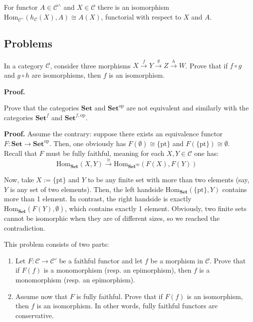 \documentclass{category-template}
\begin{document}
\begin{lemma}
    For functor $A \in \mathcal{C}^{\wedge}$ and $X \in \mathcal{C}$ there is an
    isomorphism $\text{Hom}_{\mathcal{C}^{\wedge}}(h_{\mathcal{C}}(X), A) \cong
    A(X)$, functorial with respect to $X$ and $A$.
\end{lemma}

\subsection{Problems}

\begin{problem}
    In a category $\mathcal{C}$, consider three morphisms $X \xrightarrow{f} Y
    \xrightarrow{g} Z \xrightarrow{h} W$. Prove that if $f \circ g$ and $g \circ
    h$ are isomorphisms, then $f$ is an isomorphism.
\end{problem}

\textbf{Proof.} 

\begin{problem}
    Prove that the categories $\textbf{Set}$ and $\textbf{Set}^{\text{op}}$ are
    not equivalent and similarly with the categories $\textbf{Set}^f$ and
    $\textbf{Set}^{f,\text{op}}$.
\end{problem}

\textbf{Proof.} Assume the contrary: suppose there exists an equivalence functor
$F: \textbf{Set} \to \textbf{Set}^{\text{op}}$. Then, one obviously has
$F(\emptyset) \cong \{\text{pt}\}$ and $F(\{\text{pt}\}) \cong \emptyset$.
Recall that $F$ must be fully faithful, meaning for each $X,Y \in \mathcal{C}$ one has:
\begin{equation*}
    \text{Hom}_{\textbf{Set}}(X, Y) \xrightarrow{\cong} \text{Hom}_{\textbf{Set}^{\text{op}}}(F(X), F(Y)) 
\end{equation*}

Now, take $X := \{\text{pt}\}$ and $Y$ to be any finite set with more than two
elements (say, $Y$ is any set of two elements). Then, the left handside
$\text{Hom}_{\textbf{Set}}(\{\text{pt}\}, Y)$ contains more than 1 element. In
contrast, the right handside is exactly $\text{Hom}_{\textbf{Set}}(F(Y),
\emptyset)$, which contains exactly 1 element. Obviously, two finite sets cannot
be isomorphic when they are of different sizes, so we reached the contradiction.

\begin{problem}
    This problem consists of two parts:
    \begin{enumerate}
        \item Let $F: \mathcal{C} \to \mathcal{C}'$ be a faithful functor and 
        let $f$ be a morphism in $\mathcal{C}$. Prove that if $F(f)$ is a 
        monomorphism (resp. an epimorphism), then $f$ is a monomorphism 
        (resp. an epimorphism).
        \item Assume now that $F$ is fully faithful. Prove that if $F(f)$ is 
        an isomorphism, then $f$ is an isomorphism. In other words, fully 
        faithful functors are conservative.
    \end{enumerate}
\end{problem}
\end{document}
